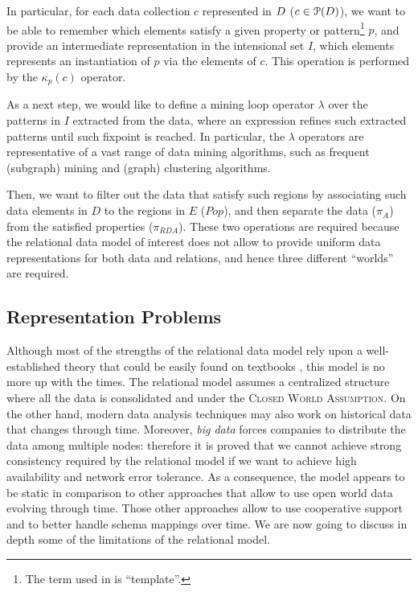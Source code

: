 In particular, for each data collection $c$ represented in $\data$ ($c\in\mathcal{P}(\data)$), we want to be able to remember which elements satisfy a given property or pattern\footnote{The term used in \cite{Calders2006} is ``template''.} $p$, and provide an intermediate representation in the intensional set $I$, which elements represents an instantiation of $p$ via the elements of $c$. This operation is performed by the $\kappa_p(c)$ operator.

As a next step, we would like to define a mining loop operator $\lambda$\index{$\lambda$} over the patterns in $I$ extracted from the data, where an expression refines such extracted patterns until such fixpoint is reached. In particular, the $\lambda$ operators are representative of a vast range of data mining algorithms, such as frequent (subgraph) mining \cite{JunghannsKAPR17} and (graph) clustering \cite{vanDongen2012} algorithms. 

Then, we want to filter out the data that satisfy such regions by associating such data elements in $D$ to the regions in $E$ ($Pop$), and then separate the data ($\pi_A$) from the satisfied properties ($\pi_{RDA}$). These two operations are required because the relational data model of interest does not allow to provide uniform data representations for both data and relations, and hence three different ``worlds'' are required. %

\subsection{Representation Problems}\label{sec:relreprprob}
Although most of the strengths of the relational data model rely upon a well-established theory \cite{Codd} that could be easily found on textbooks \cite{Garcia-Molina}, this model is no more up with the times. The relational model assumes a centralized structure where all the data is consolidated and under the \textsc{Closed World Assumption}. On the other hand, modern data analysis techniques may also work on historical data that changes through time. Moreover, \textit{big data} forces companies to distribute the data among multiple nodes: therefore it is proved \cite{Gilbert02} that we cannot achieve strong consistency required by the relational model if we want to achieve high availability and network error tolerance. As a consequence, the model appears to be static \cite{Badia} in comparison to other approaches that allow to use open world data evolving through time. Those other approaches allow to use cooperative support \cite{Aligon201520} and to better handle schema mappings over time.  We are now going to discuss in depth some of the limitations of the relational model.


